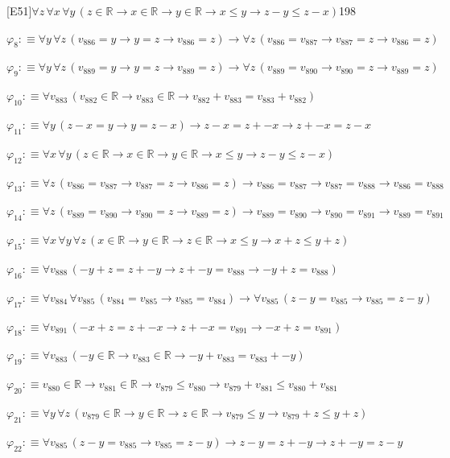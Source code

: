 \begin{fullproof}{[E51]}{$\forall z\,\forall x\,\forall y\,(z \in \mathbb{R} \to x \in \mathbb{R} \to y \in \mathbb{R} \to x \leq y \to z - y \leq z - x)$}{198}
\begin{abbrevlist}
\item $\varphi_{8} :\equiv \forall y\,\forall z\,(v_{886} = y \to y = z \to v_{886} = z) \to \forall z\,(v_{886} = v_{887} \to v_{887} = z \to v_{886} = z)$
\item $\varphi_{9} :\equiv \forall y\,\forall z\,(v_{889} = y \to y = z \to v_{889} = z) \to \forall z\,(v_{889} = v_{890} \to v_{890} = z \to v_{889} = z)$
\item $\varphi_{10} :\equiv \forall v_{883}\,(v_{882} \in \mathbb{R} \to v_{883} \in \mathbb{R} \to v_{882} + v_{883} = v_{883} + v_{882})$
\item $\varphi_{11} :\equiv \forall y\,(z - x = y \to y = z - x) \to z - x = z + -x \to z + -x = z - x$
\item $\varphi_{12} :\equiv \forall x\,\forall y\,(z \in \mathbb{R} \to x \in \mathbb{R} \to y \in \mathbb{R} \to x \leq y \to z - y \leq z - x)$
\item $\varphi_{13} :\equiv \forall z\,(v_{886} = v_{887} \to v_{887} = z \to v_{886} = z) \to v_{886} = v_{887} \to v_{887} = v_{888} \to v_{886} = v_{888}$
\item $\varphi_{14} :\equiv \forall z\,(v_{889} = v_{890} \to v_{890} = z \to v_{889} = z) \to v_{889} = v_{890} \to v_{890} = v_{891} \to v_{889} = v_{891}$
\item $\varphi_{15} :\equiv \forall x\,\forall y\,\forall z\,(x \in \mathbb{R} \to y \in \mathbb{R} \to z \in \mathbb{R} \to x \leq y \to x + z \leq y + z)$
\item $\varphi_{16} :\equiv \forall v_{888}\,(-y + z = z + -y \to z + -y = v_{888} \to -y + z = v_{888})$
\item $\varphi_{17} :\equiv \forall v_{884}\,\forall v_{885}\,(v_{884} = v_{885} \to v_{885} = v_{884}) \to \forall v_{885}\,(z - y = v_{885} \to v_{885} = z - y)$
\item $\varphi_{18} :\equiv \forall v_{891}\,(-x + z = z + -x \to z + -x = v_{891} \to -x + z = v_{891})$
\item $\varphi_{19} :\equiv \forall v_{883}\,(-y \in \mathbb{R} \to v_{883} \in \mathbb{R} \to -y + v_{883} = v_{883} + -y)$
\item $\varphi_{20} :\equiv v_{880} \in \mathbb{R} \to v_{881} \in \mathbb{R} \to v_{879} \leq v_{880} \to v_{879} + v_{881} \leq v_{880} + v_{881}$
\item $\varphi_{21} :\equiv \forall y\,\forall z\,(v_{879} \in \mathbb{R} \to y \in \mathbb{R} \to z \in \mathbb{R} \to v_{879} \leq y \to v_{879} + z \leq y + z)$
\item $\varphi_{22} :\equiv \forall v_{885}\,(z - y = v_{885} \to v_{885} = z - y) \to z - y = z + -y \to z + -y = z - y$

\end{abbrevlist}
\end{fullproof}
